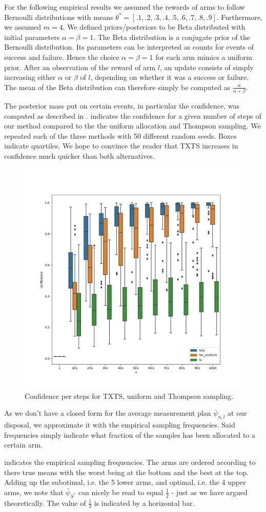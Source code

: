 For the following empirical results we assumed the rewards of arms to follow
Bernoulli distributions with means $\theta^* = [.1, .2, .3, .4, .5, .6, .7, .8,
.9]$. Furthermore, we assumed $m=4$. We defined priors/posteriors to be Beta
distributed with initial parameters $\alpha = \beta = 1$. The Beta distribution
is a conjugate prior of the Bernoulli distribution. Its parameters can be
interpreted as counts for events of success and failure. Hence the choice
$\alpha = \beta = 1$ for each arm mimics a uniform prior. After an observation
of the reward of arm $l$, an update consists of simply increasing either
$\alpha$ or $\beta$ of $l$, depending on whether it was a success or failure.
The mean of the Beta distribution can therefore simply be computed as
$\frac{\alpha}{\alpha + \beta}$.

The posterior mass put on certain events, in particular the confidence, was
computed as described in . 
indicates the confidence for a given number of steps of our method compared to
the the uniform allocation and Thompson sampling. We repeated each of the three
methods with 50 different random seeds. Boxes indicate quartiles. We
hope to convince the reader that TXTS increases in confidence much quicker than
both alternatives.
\begin{figure}[h]
  \centering
  \includegraphics[width=.5\textwidth]{190723-confidences.png}
  \caption{Confidence per steps for TXTS, uniform and Thompson sampling.}
  \label{fig:confidences}
\end{figure}

As we don't have a closed form for the average measurement plan
$\bar{\psi}_{n,l}$ at our disposal, we approximate it with the empirical
sampling frequencies. Said frequencies simply indicate what fraction of the
samples has been allocated to a certain arm.

 indicates the empirical sampling frequencies. The
arms are ordered according to there true means with the worst being at the
bottom and the best at the top. Adding up the subotimal, i.e. the 5 lower arms,
and optimal, i.e. the 4 upper arms, we note that $\bar{\psi}_{S^*}$ can nicely
be read to equal $\frac{1}{2}$ - just as we have argued theoretically. The value
of $\frac{1}{2}$ is indicated by a horizontal bar.

